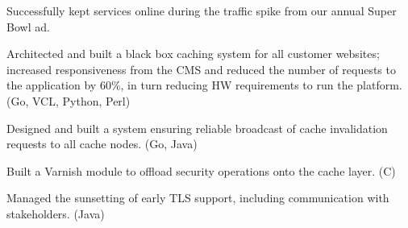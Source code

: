 \item Successfully kept services online during the traffic spike from our annual Super Bowl ad.

\item Architected and built a black box caching system for all customer websites; increased responsiveness from the CMS
and reduced the number of requests to the application by 60\%, in turn reducing HW requirements to run the platform.
(Go, VCL, Python, Perl)

\item Designed and built a system ensuring reliable broadcast of cache invalidation requests to all cache nodes. (Go,
Java)

\item Built a Varnish module to offload security operations onto the cache layer. (C)

\item Managed the sunsetting of early TLS support, including communication with stakeholders. (Java)

